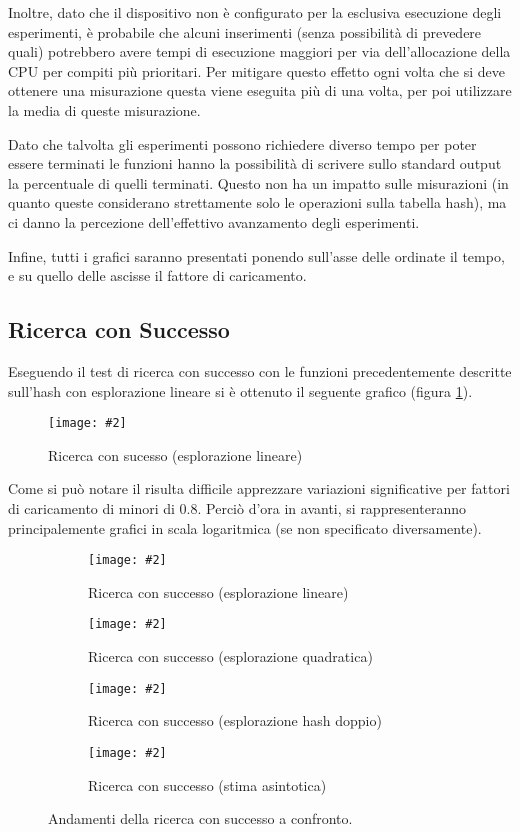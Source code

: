 \documentclass{article}
\newcommand{\image}[3][1]{
	\centering
	\texttt{[image: \#2]}
	\caption{#3}
}
\begin{document}
Inoltre, dato che il dispositivo non è configurato per la esclusiva esecuzione degli esperimenti, è probabile che alcuni inserimenti (senza possibilità di prevedere quali) potrebbero avere tempi di esecuzione maggiori per via dell'allocazione della CPU per compiti più prioritari. Per mitigare questo effetto ogni volta che si deve ottenere una misurazione questa viene eseguita più di una volta, per poi utilizzare la media di queste misurazione.

Dato che talvolta gli esperimenti possono richiedere diverso tempo per poter essere terminati le funzioni hanno la possibilità di scrivere sullo standard output la percentuale di quelli terminati. Questo non ha un impatto sulle misurazioni (in quanto queste considerano strettamente solo le operazioni sulla tabella hash), ma ci danno la percezione dell'effettivo avanzamento degli esperimenti.

Infine, tutti i grafici saranno presentati ponendo sull'asse delle ordinate il tempo, e su quello delle ascisse il fattore di caricamento.

\subsection{Ricerca con Successo}

Eseguendo il test di ricerca con successo con le funzioni precedentemente descritte sull'hash con esplorazione lineare si è ottenuto il seguente grafico (figura \ref{fig:Successo_Lineare_scala_lineare}).
\begin{figure}[H]
\image[0.75]{Successo_Lineare_scala_lineare}{Ricerca con sucesso (esplorazione lineare)}
\label{fig:Successo_Lineare_scala_lineare}
\end{figure}

\label{Motivazione_scala}
Come si può notare il risulta difficile apprezzare variazioni significative per fattori di caricamento di minori di 0.8. Perciò d'ora in avanti, si rappresenteranno principalemente grafici in scala logaritmica (se non specificato diversamente). 

\begin{figure}[H]
\begin{subfigure}[b]{0.5\textwidth}
\image{Successo_Lineare_scala_logaritmica}{Ricerca con successo (esplorazione lineare)}
\end{subfigure}
\begin{subfigure}[b]{0.5\textwidth}
\image{Successo_Quadratico_scala_logaritmica}{Ricerca con successo (esplorazione quadratica)}
\end{subfigure}
\begin{subfigure}[b]{0.5\textwidth}
\image{Successo_Doppio_scala_logaritmica}{Ricerca con successo (esplorazione hash doppio)}
\end{subfigure}
\begin{subfigure}[b]{0.5\textwidth}
\image{Successo_Asintotica_scala_logaritmica}{Ricerca con successo (stima asintotica)}
\end{subfigure}
\caption{Andamenti della ricerca con successo a confronto.}
\label{fig:Successo_quartetto}
\end{figure}
\end{document}
